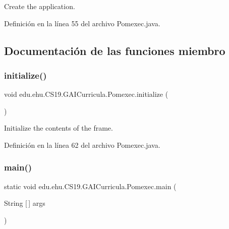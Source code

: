 Create the application. 



Definición en la línea 55 del archivo Pomexec.\+java.



\subsection{Documentación de las funciones miembro}
\mbox{\label{classedu_1_1ehu_1_1_c_s19_1_1_g_a_i_curricula_1_1_pomexec_ab89003495509c2f11da18c9675828571}} 
\subsubsection{\texorpdfstring{initialize()}{initialize()}}
{\footnotesize\ttfamily void edu.\+ehu.\+C\+S19.\+G\+A\+I\+Curricula.\+Pomexec.\+initialize (\begin{DoxyParamCaption}{ }\end{DoxyParamCaption})\hspace{0.3cm}{\ttfamily [private]}}



Initialize the contents of the frame. 



Definición en la línea 62 del archivo Pomexec.\+java.

\mbox{\label{classedu_1_1ehu_1_1_c_s19_1_1_g_a_i_curricula_1_1_pomexec_a52ecabe81c9c3180cdccb3749b6553d6}} 
\subsubsection{\texorpdfstring{main()}{main()}}
{\footnotesize\ttfamily static void edu.\+ehu.\+C\+S19.\+G\+A\+I\+Curricula.\+Pomexec.\+main (\begin{DoxyParamCaption}\item[{String \mbox{[}$\,$\mbox{]}}]{args }\end{DoxyParamCaption})\hspace{0.3cm}{\ttfamily [static]}}



